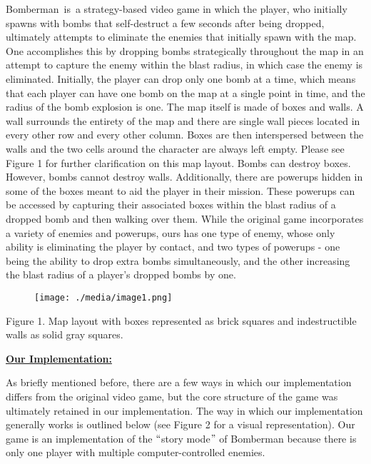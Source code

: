\documentclass[12pt]{article}
\begin{document}
Bomberman\ is\ a strategy-based video game in which the player, who initially spawns with bombs that self-destruct a few seconds after being dropped, ultimately attempts to eliminate the enemies that initially spawn with the map. One accomplishes this by dropping bombs strategically throughout the map in an attempt to capture the enemy within the blast radius, in which case the enemy is eliminated. Initially, the player can drop only one bomb at a time, which means that each player can have one bomb on the map at a single point in time, and the radius of the bomb explosion is one. The map itself is made of boxes and walls. A wall surrounds the entirety of the map and there are single wall pieces located in every other row and every other column. Boxes are then interspersed between the walls and the two cells around the character are always left empty.  Please see Figure 1 for further clarification on this map layout.  Bombs can destroy boxes. However, bombs cannot destroy walls. Additionally, there are powerups hidden in some of the boxes meant to aid the player in their mission. These powerups can be accessed by capturing their associated boxes within the blast radius of a dropped bomb and then walking over them. While the original game incorporates a variety of enemies and powerups, ours has one type of enemy, whose only ability is eliminating the player by contact, and two types of powerups - one being the ability to drop extra bombs simultaneously, and the other increasing the blast radius of a player’s dropped bombs by one.\par




\begin{figure}[H]
\advance\leftskip 0.0in		\texttt{[image: ./media/image1.png]}
\end{figure}



Figure 1. Map layout with boxes represented as brick squares and indestructible walls as solid gray squares.\par


\vspace{\baselineskip}
\textbf{\uline{Our Implementation:}}\par

As briefly mentioned before, there are a few ways in which our implementation differs from the original video game, but the core structure of the game was ultimately retained in our implementation. The way in which our implementation generally works is outlined below (see Figure 2 for a visual representation). Our game is an implementation of the $``$story mode$"$  of Bomberman because there is only one player with multiple computer-controlled enemies.\par
\end{document}
